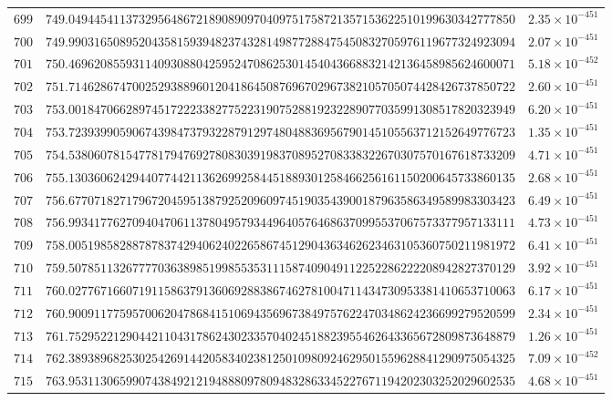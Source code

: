 \documentclass[12pt,reqno]{amsart}
\theoremstyle{remark}
\begin{document}
\begin{longtable}{clc}
$699$ & $749.0494454113732956486721890890970409751758721357153622510199630342777850$ & $2.35\times 10^{-451}$ \\
$700$ & $749.9903165089520435815939482374328149877288475450832705976119677324923094$ & $2.07\times 10^{-451}$ \\
$701$ & $750.4696208559311409308804259524708625301454043668832142136458985624600071$ & $5.18\times 10^{-452}$ \\
$702$ & $751.7146286747002529388960120418645087696702967382105705074428426737850722$ & $2.60\times 10^{-451}$ \\
$703$ & $753.0018470662897451722233827752231907528819232289077035991308517820323949$ & $6.20\times 10^{-451}$ \\
$704$ & $753.7239399059067439847379322879129748048836956790145105563712152649776723$ & $1.35\times 10^{-451}$ \\
$705$ & $754.5380607815477817947692780830391983708952708338322670307570167618733209$ & $4.71\times 10^{-451}$ \\
$706$ & $755.1303606242944077442113626992584451889301258466256161150200645733860135$ & $2.68\times 10^{-451}$ \\
$707$ & $756.6770718271796720459513879252096097451903543900187963586349589983303423$ & $6.49\times 10^{-451}$ \\
$708$ & $756.9934177627094047061137804957934496405764686370995537067573377957133111$ & $4.73\times 10^{-451}$ \\
$709$ & $758.0051985828878783742940624022658674512904363462623463105360750211981972$ & $6.41\times 10^{-451}$ \\
$710$ & $759.5078511326777703638985199855353111587409049112252286222208942827370129$ & $3.92\times 10^{-451}$ \\
$711$ & $760.0277671660719115863791360692883867462781004711434730953381410653710063$ & $6.17\times 10^{-451}$ \\
$712$ & $760.9009117759570062047868415106943569673849757622470348624236699279520599$ & $2.34\times 10^{-451}$ \\
$713$ & $761.7529522129044211043178624302335704024518823955462643365672809873648879$ & $1.26\times 10^{-451}$ \\
$714$ & $762.3893896825302542691442058340238125010980924629501559628841290975054325$ & $7.09\times 10^{-452}$ \\
$715$ & $763.9531130659907438492121948880978094832863345227671194202303252029602535$ & $4.68\times 10^{-451}$ \\

\end{longtable}
\end{document}
